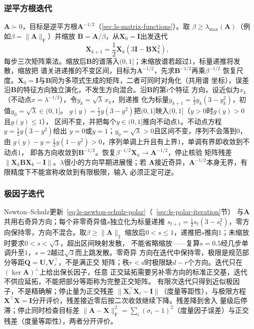 \subsubsection{逆平方根迭代}

$\bm A\succ0$，目标是逆平方根$\bm A^{-1/2}$（\ref{sec:ls-matrix-functions}）。取
$\beta\geq\lambda_{\max}(\bm A)$（例如$\beta=\lVert\bm A\rVert_{\mathrm F}$）并缩放
$\bm B=\bm A/\beta$，从$\bm X_0=\bm I$出发迭代
\begin{equation}
 \bm X_{k+1}=\frac12\bm X_k(3\bm I-\bm B\bm X_k^2),
 \label{eq:ls-inverse-rsqrt-iteration}
\end{equation}
每步三次矩阵乘法。缩放后$\bm B$的谱落入$(0,1]$；未缩放谱若超过$1$，标量递推将发散，缩放把
谱关进递推的不变区间，目标为$\bm A^{-1/2}$，先求$\bm B^{-1/2}$再乘$\beta^{-1/2}$
恢复尺度。$\bm X_0=\bm I$与$\bm B$同为多项式生成的矩阵，二者可同时对角化（共用谱
坐标），误差沿$\bm B$的特征方向独立演化，不发生方向混合。沿$\bm B$的第$i$个特征
方向，设近似为$x_k$（不动点$x=\lambda^{-1/2}$），令$y_k=\sqrt\lambda\,x_k$，则递推
化为标量$y_{k+1}=\tfrac12y_k(3-y_k^2)$，初值$y_0=\sqrt\lambda\in(0,1]$。
$g(y)=\tfrac12y(3-y^2)$把$(0,1]$映入$(0,1]$（$y>0$时$g(y)>0$且$g(y)\leq1$），
区间不变，并把每个$y\in(0,1]$推向不动点$1$。不动点方程$y=\tfrac12y(3-y^2)$给出
$y=0$或$y=1$；$y_0=\sqrt\lambda>0$且区间不变，序列不会落到$0$，由
$g(y)-y=\tfrac12y(1-y^2)>0$，序列单调上升且有上界$1$，单调有界即收敛到不动点$1$，
即各方向收敛到$\bm B^{-1/2}$。恢复$\beta^{-1/2}\bm X_k\to\bm A^{-1/2}$，停止核验
矩阵残差$\lVert\bm X_k\bm B\bm X_k-\bm I\rVert$。$\lambda$很小的方向早期进展慢；若
$\bm A$接近奇异，$\bm A^{-1/2}$本身无界，有限精度下不能宣称收敛到有限极限，输入
必须正定可逆。

\subsubsection{极因子迭代}

Newton--Schulz更新~\eqref{eq:ls-newton-schulz-polar}（~\ref{sec:ls-polar-iteration}节）
与$\bm A$共用右奇异方向；每个非零奇异值$s$独立化为标量递推
$s_{t+1}=\tfrac12s_t(3-s_t^2)$，零方向保持零，方向不混合。取$\beta\geq\lVert\bm A\rVert_2$
缩放后$0<s\leq1$，递推把$s$推向$1$；未缩放时要求$0<s<\sqrt3$，超出区间映射发散，
不能省略缩放——复算$s=0.5$经几步单调升至$1$，$s=2$越过$\sqrt3$而上跳发散。零奇异
方向在迭代中保持零，极限是规范部分等距$\bm Q=\bm U_r\bm V_r^{\top}$，不是满正交
矩阵；秩$r<d$时极限缺$d-r$个方向。迭代只在$(\ker\bm A)^\perp$上给出保长因子，任意
正交延拓需要另补零方向的标准正交基，迭代不供应延拓，不能把部分等距称为完整正交矩阵。
有限次迭代只得到近似极因子，不是精确解；停止量为正交残差
$\lVert\bm X_t^{\top}\bm X_t-\bm I\rVert$（度量等距性），与极限方程
$\bm X^{\top}\bm X=\bm I$分开评价，残差接近零后按二次收敛继续下降。残差降到舍入
量级后停滞；停止同时检查目标差
$\lVert\bm A-\bm X\rVert_{\mathrm F}^2=\sum_i(\sigma_i-1)^2$（度量因子误差）与正交
残差（度量等距性），两者分开评价。

